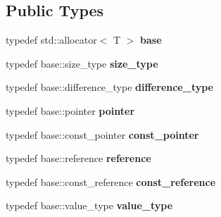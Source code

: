 \subsection*{Public Types}
\begin{DoxyCompactItemize}
\item 
\mbox{\label{structzero__after__free__allocator_aab907d58a45f5bf4baeaefb373f00987}} 
typedef std\+::allocator$<$ T $>$ {\bfseries base}
\item 
\mbox{\label{structzero__after__free__allocator_a85f5f3250c0519ea82ff33d980e73994}} 
typedef base\+::size\+\_\+type {\bfseries size\+\_\+type}
\item 
\mbox{\label{structzero__after__free__allocator_ab45fc8fc90d403b3b44715616e167658}} 
typedef base\+::difference\+\_\+type {\bfseries difference\+\_\+type}
\item 
\mbox{\label{structzero__after__free__allocator_a5cc395dbe16fe421abb6cdbcb96e06bd}} 
typedef base\+::pointer {\bfseries pointer}
\item 
\mbox{\label{structzero__after__free__allocator_a197fbd41cb35428c2ed27c23b742ec9b}} 
typedef base\+::const\+\_\+pointer {\bfseries const\+\_\+pointer}
\item 
\mbox{\label{structzero__after__free__allocator_a27e208c4c218d79cf0df9b524c674ddb}} 
typedef base\+::reference {\bfseries reference}
\item 
\mbox{\label{structzero__after__free__allocator_ab9e83de52f17c19f263bef6ba258fbed}} 
typedef base\+::const\+\_\+reference {\bfseries const\+\_\+reference}
\item 
\mbox{\label{structzero__after__free__allocator_aebbf8f000c73198eec060af6734e1f91}} 
typedef base\+::value\+\_\+type {\bfseries value\+\_\+type}
\end{DoxyCompactItemize}
